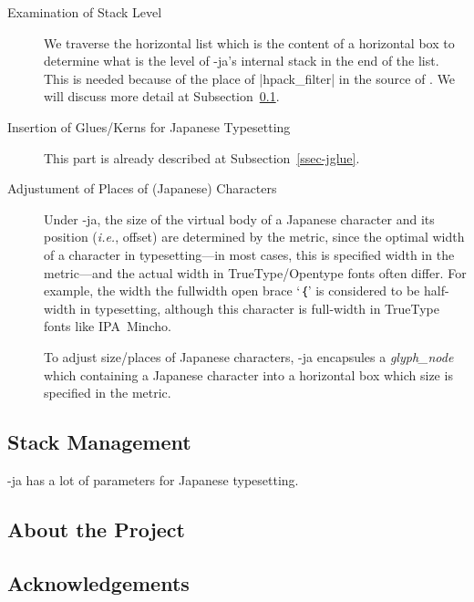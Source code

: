 \documentclass{ajt}
\begin{document}
\begin{description}
\item[Examination of Stack Level] We traverse the horizontal list which is the content of a horizontal box 
to determine what is the level of \LuaTeX-ja's internal stack in the end
	   of the list. This is needed because of the place of
	   |hpack_filter| in the source of \LuaTeX. We will discuss more detail at Subsection~\ref{ssec-stack}.

\item[Insertion of Glues/Kerns for Japanese Typesetting]
This part is already described at Subsection~\ref{ssec-jglue}. 

\item[Adjustument of Places of (Japanese) Characters]
Under \LuaTeX-ja, the size of the virtual body of a Japanese character
	   and its position (\emph{i.e.}, offset) are determined by the
	   metric, since the optimal width of a character in
	   typesetting---in most cases, this is specified width in the
	   metric---and the actual width in TrueType/Opentype fonts
	   often differ. For example, the width the fullwidth open brace
	   `\inhibitglue ｛' is considered to be half-width in
	   typesetting, although this character is full-width in
	   TrueType fonts like IPA~Mincho.

To adjust size/places of Japanese characters, \LuaTeX-ja encapsules a
	   \textit{glyph\_node} which containing a Japanese character
	   into a horizontal box which size is specified in the metric.
\end{description}

\subsection{Stack Management}
\label{ssec-stack}
\LuaTeX-ja has a lot of parameters for Japanese typesetting. 

\subsection*{About the Project}
\subsection*{Acknowledgements}
\end{document}
